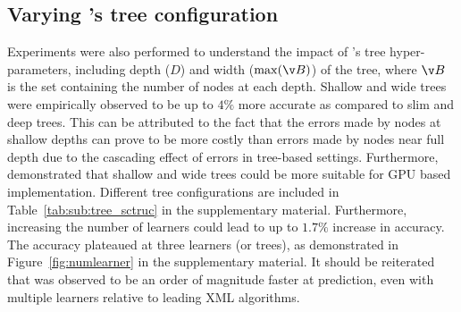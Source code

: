 \subsection{Varying \alg's tree configuration}
Experiments were also performed to understand the impact of \alg's tree hyper-parameters, including depth ($D$) and width ($\max(\v B)$) of the tree, where $\v B$ is the set containing the number of nodes at each depth. Shallow and wide trees were empirically observed to be up to $4\%$ more accurate as compared to slim and deep trees. This can be attributed to the fact that the errors made by nodes at shallow depths can prove to be more costly than errors made by nodes near full depth due to the cascading effect of errors in tree-based settings. Furthermore,~\citep{grave17} demonstrated that shallow and wide trees could be more suitable for GPU based implementation. Different tree configurations are included in Table~\ref{tab:sub:tree_sctruc} in the supplementary material. Furthermore, increasing the number of learners could lead to up to $1.7\%$ increase in accuracy. The accuracy plateaued at three learners (or trees), as demonstrated in Figure~\ref{fig:numlearner} in the supplementary material. It should be reiterated that \alg was observed to be an order of magnitude faster at prediction, even with multiple learners relative to leading XML algorithms.
